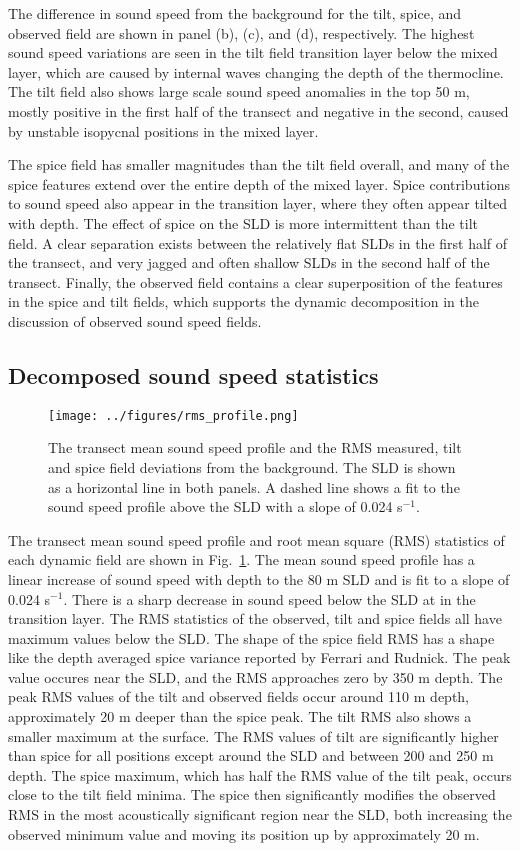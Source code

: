 \documentclass[preprint,NumberedRefs]{JASA}
\begin{document}
The difference in sound speed from the background for the tilt, spice, and observed field are shown in panel (b), (c), and (d), respectively. The highest sound speed variations are seen in the tilt field transition layer below the mixed layer, which are caused by internal waves changing the depth of the thermocline\cite{colosi21}. The tilt field also shows large scale sound speed anomalies in the top 50 m, mostly positive in the first half of the transect and negative in the second, caused by unstable isopycnal positions in the mixed layer.

The spice field has smaller magnitudes than the tilt field overall, and many of the spice features extend over the entire depth of the mixed layer. Spice contributions to sound speed also appear in the transition layer, where they often appear tilted with depth. The effect of spice on the SLD is more intermittent than the tilt field. A clear separation exists between the relatively flat SLDs in the first half of the transect, and very jagged and often shallow SLDs in the second half of the transect. Finally, the observed field contains a clear superposition of the features in the spice and tilt fields, which supports the dynamic decomposition in the discussion of observed sound speed fields.

\subsection{Decomposed sound speed statistics}
\begin{figure}
\texttt{[image: ../figures/rms\_profile.png]}
        \caption{\label{fig:c_rms}{The transect mean sound speed profile and the RMS measured, tilt and spice field deviations from the background. The SLD is shown as a horizontal line in both panels. A dashed line shows a fit to the sound speed profile above the SLD with a slope of 0.024 s$^{-1}$.}}
\end{figure}

The transect mean sound speed profile and root mean square (RMS) statistics of each dynamic field are shown in Fig.~\ref{fig:c_rms}. The mean sound speed profile has a linear increase of sound speed with depth to the 80 m SLD and is fit to a slope of 0.024 s$^{-1}$. There is a sharp decrease in sound speed below the SLD at in the transition layer. The RMS statistics of the observed, tilt and spice fields all have maximum values below the SLD. The shape of the spice field RMS has a shape like the depth averaged spice variance reported by Ferrari and Rudnick\citep{ferrari2000}. The peak value occures near the SLD, and the RMS approaches zero by 350 m depth. The peak RMS values of the tilt and observed fields occur around 110 m depth, approximately 20 m deeper than the spice peak. The tilt RMS also shows a smaller maximum at the surface. The RMS values of tilt are significantly higher than spice for all positions except around the SLD and between 200 and 250 m depth. The spice maximum, which has half the RMS value of the tilt peak, occurs close to the tilt field minima. The spice then significantly modifies the observed RMS in the most acoustically significant region near the SLD, both increasing the observed minimum value and moving its position up by approximately 20 m.
\end{document}
